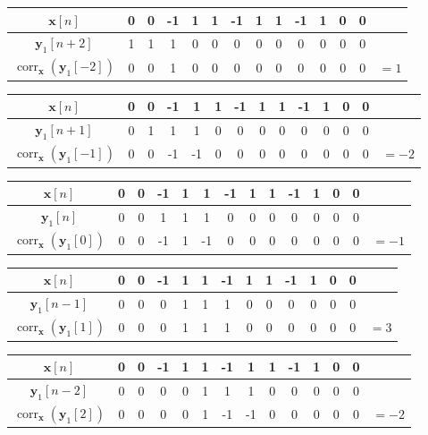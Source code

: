 \documentclass[]{article}
\renewcommand{\vec}[1]{\mathbf{#1}}
\newcommand{\corr}{\operatorname{corr}}
\begin{document}
\begin{flushleft}
\begin{tabular}{c|ccccccccccccc}
	\(\vec{x}[n]\) & 0 & 0 & -1 & 1 & 1 & -1 & 1 & 1 & -1 & 1 & 0 & 0 \\
	\hline
	\(\vec{y}_1[n + 2]\) & 1 & 1 & 1 & 0 & 0 & 0 & 0 & 0 & 0 & 0 & 0 & 0 \\
	\(\corr_{\vec{x}}(\vec{y}_1[-2])\) & 0 & 0 & 1 & 0 & 0 & 0 & 0 & 0 & 0 & 0 & 0 & 0 & \(= 1\) \\
\end{tabular} \vspace{5 mm}
\begin{tabular}{c|ccccccccccccc}
	\(\vec{x}[n]\) & 0 & 0 & -1 & 1 & 1 & -1 & 1 & 1 & -1 & 1 & 0 & 0 \\
	\hline
	\(\vec{y}_1[n + 1]\) & 0 & 1 & 1 & 1 & 0 & 0 & 0 & 0 & 0 & 0 & 0 & 0 \\
	\(\corr_{\vec{x}}(\vec{y}_1[-1])\) & 0 & 0 & -1 & -1 & 0 & 0 & 0 & 0 & 0 & 0 & 0 & 0 & \(= -2\) \\
\end{tabular} \vspace{5 mm}
\begin{tabular}{c|ccccccccccccc}
	\(\vec{x}[n]\) & 0 & 0 & -1 & 1 & 1 & -1 & 1 & 1 & -1 & 1 & 0 & 0 \\
	\hline
	\(\vec{y}_1[n]\) & 0 & 0 & 1 & 1 & 1 & 0 & 0 & 0 & 0 & 0 & 0 & 0 \\
	\(\corr_{\vec{x}}(\vec{y}_1[0])\) & 0 & 0 & -1 & 1 & -1 & 0 & 0 & 0 & 0 & 0 & 0 & 0 & \(= -1\) \\
\end{tabular} \vspace{5 mm}
\begin{tabular}{c|ccccccccccccc}
	\(\vec{x}[n]\) & 0 & 0 & -1 & 1 & 1 & -1 & 1 & 1 & -1 & 1 & 0 & 0 \\
	\hline
	\(\vec{y}_1[n - 1]\) & 0 & 0 & 0 & 1 & 1 & 1 & 0 & 0 & 0 & 0 & 0 & 0 \\
	\(\corr_{\vec{x}}(\vec{y}_1[1])\) & 0 & 0 & 0 & 1 & 1 & 1 & 0 & 0 & 0 & 0 & 0 & 0 & \(= 3\) \\
\end{tabular} \vspace{5 mm}
\begin{tabular}{c|ccccccccccccc}
	\(\vec{x}[n]\) & 0 & 0 & -1 & 1 & 1 & -1 & 1 & 1 & -1 & 1 & 0 & 0 \\
	\hline
	\(\vec{y}_1[n - 2]\) & 0 & 0 & 0 & 0 & 1 & 1 & 1 & 0 & 0 & 0 & 0 & 0 \\
	\(\corr_{\vec{x}}(\vec{y}_1[2])\) & 0 & 0 & 0 & 0 & 1 & -1 & -1 & 0 & 0 & 0 & 0 & 0 & \(= -2\) \\

\end{tabular}
\end{flushleft}
\end{document}
